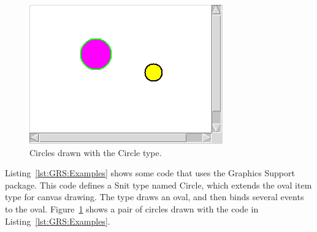 
\begin{figure}[hbpt]
\begin{centering}
\includegraphics{Circles.png}
\caption{Circles drawn with the Circle type.}
\label{fig:GRS:Circles}
\end{centering}
\end{figure}
Listing~\ref{lst:GRS:Examples} shows some code that uses the Graphics
Support package.  This code defines a Snit type named Circle, which extends
the oval item type for canvas drawing.  The type draws an oval, and
then binds several events to the oval. Figure~\ref{fig:GRS:Circles}
shows a pair of circles drawn with the code in
Listing~\ref{lst:GRS:Examples}.


